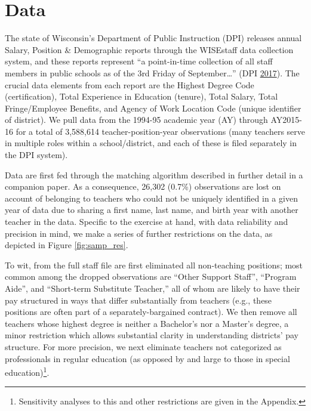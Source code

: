 \documentclass[]{article}
\let\rmarkdownfootnote\footnote%
\def\footnote{\protect\rmarkdownfootnote}
\begin{document}
\section{Data}\label{data}

The state of Wisconsin's Department of Public Instruction (DPI) releases
annual Salary, Position \& Demographic reports through the WISEstaff
data collection system, and these reports represent ``a point-in-time
collection of all staff members in public schools as of the 3rd Friday
of September\ldots{}'' (DPI \protect\hyperlink{ref-dpi}{2017}). The
crucial data elements from each report are the Highest Degree Code
(certification), Total Experience in Education (tenure), Total Salary,
Total Fringe/Employee Benefits, and Agency of Work Location Code (unique
identifier of district). We pull data from the 1994-95 academic year
(AY) through AY2015-16 for a total of 3,588,614 teacher-position-year
observations (many teachers serve in multiple roles within a
school/district, and each of these is filed separately in the DPI
system).

Data are first fed through the matching algorithm described in further
detail in a companion paper. As a consequence, 26,302 (0.7\%)
observations are lost on account of belonging to teachers who could not
be uniquely identified in a given year of data due to sharing a first
name, last name, and birth year with another teacher in the data.
Specific to the exercise at hand, with data reliability and precision in
mind, we make a series of further restrictions on the data, as depicted
in Figure \ref{fig:samp_res}.

To wit, from the full staff file are first eliminated all non-teaching
positions; most common among the dropped observations are ``Other
Support Staff'', ``Program Aide'', and ``Short-term Substitute
Teacher,'' all of whom are likely to have their pay structured in ways
that differ substantially from teachers (e.g., these positions are often
part of a separately-bargained contract). We then remove all teachers
whose highest degree is neither a Bachelor's nor a Master's degree, a
minor restriction which allows substantial clarity in understanding
districts' pay structure. For more precision, we next eliminate teachers
not categorized as professionals in regular education (as opposed by and
large to those in special education)\footnote{Sensitivity analyses to
  this and other restrictions are given in the Appendix.}.
\end{document}
